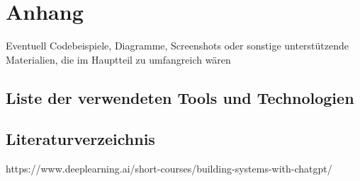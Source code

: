 \chapter{Anhang}
Eventuell Codebeispiele, Diagramme, Screenshots oder sonstige unterstützende Materialien, die im Hauptteil zu umfangreich wären

\section{Liste der verwendeten Tools und Technologien}

\section{Literaturverzeichnis}

https://www.deeplearning.ai/short-courses/building-systems-with-chatgpt/